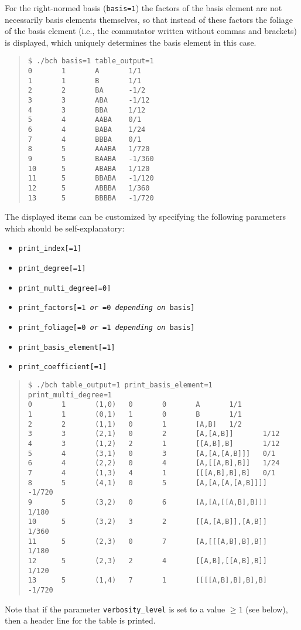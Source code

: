 \documentclass[11pt,a4paper]{article}
\begin{document}
For the right-normed basis (\verb|basis=1|) the factors of
the basis element are not necessarily
basis elements themselves, so that instead of these factors the foliage 
of the basis element (i.e., the commutator written without commas and brackets)
is displayed, which uniquely determines the basis element  in this case.
\begin{quote} %
{\small\begin{BVerbatim}
$ ./bch basis=1 table_output=1
0       1       A       1/1
1       1       B       1/1
2       2       BA      -1/2
3       3       ABA     -1/12
4       3       BBA     1/12
5       4       AABA    0/1
6       4       BABA    1/24
7       4       BBBA    0/1
8       5       AAABA   1/720
9       5       BAABA   -1/360
10      5       ABABA   1/120
11      5       BBABA   -1/120
12      5       ABBBA   1/360
13      5       BBBBA   -1/720
\end{BVerbatim}
}\end{quote}
The displayed items can be customized by specifying the following parameters
which should be self-explanatory:
\begin{itemize}
\item {\tt print\_index[=1]}
\item {\tt print\_degree[=1]}
\item {\tt print\_multi\_degree[=0]}
\item {\tt print\_factors[=1 {\em or} =0 {\em depending on} basis]}
\item {\tt print\_foliage[=0 {\em or} =1 {\em depending on} basis]}
\item {\tt print\_basis\_element[=1]}
\item {\tt print\_coefficient[=1]}
\end{itemize}
\begin{quote} %
{\small\begin{BVerbatim}
$ ./bch table_output=1 print_basis_element=1 print_multi_degree=1
0       1       (1,0)   0       0       A       1/1
1       1       (0,1)   1       0       B       1/1
2       2       (1,1)   0       1       [A,B]   1/2
3       3       (2,1)   0       2       [A,[A,B]]       1/12
4       3       (1,2)   2       1       [[A,B],B]       1/12
5       4       (3,1)   0       3       [A,[A,[A,B]]]   0/1
6       4       (2,2)   0       4       [A,[[A,B],B]]   1/24
7       4       (1,3)   4       1       [[[A,B],B],B]   0/1     
8       5       (4,1)   0       5       [A,[A,[A,[A,B]]]]       -1/720
9       5       (3,2)   0       6       [A,[A,[[A,B],B]]]       1/180
10      5       (3,2)   3       2       [[A,[A,B]],[A,B]]       1/360
11      5       (2,3)   0       7       [A,[[[A,B],B],B]]       1/180
12      5       (2,3)   2       4       [[A,B],[[A,B],B]]       1/120
13      5       (1,4)   7       1       [[[[A,B],B],B],B]       -1/720
\end{BVerbatim}
}\end{quote}
Note that if the parameter  \verb|verbosity_level| 
is set to a value $\geq 1$ (see below), then  a header line for the table 
is printed.
\end{document}
